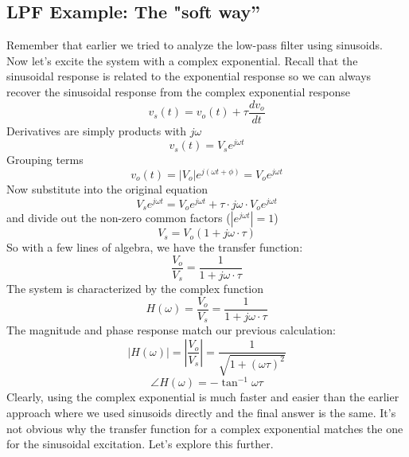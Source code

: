 \subsection{LPF Example:  The "soft way''}
Remember that earlier we tried to analyze the low-pass filter using sinusoids.  Now let's excite the system with a complex exponential.  Recall that the sinusoidal response is related to the exponential response so we can always recover the sinusoidal response from the complex exponential response
    \begin{equation}
        v_s(t) = v_o(t) + \tau \frac{dv_o}{dt}
    \end{equation}
Derivatives are simply products with $j\omega$
    \begin{equation}
        v_s(t) = V_s e^{j\omega t}
    \end{equation}
Grouping terms
    \begin{equation}
        v_o(t) = |V_o| e^{j (\omega t + \phi)} = V_o e^{j\omega t}
    \end{equation}
Now substitute into the original equation
    \begin{equation}
        V_s e^{j \omega t} = V_o e^{j \omega t}  + \tau \cdot j\omega \cdot V_o e^{j \omega t}
    \end{equation}
and divide out the non-zero common factors ($|e^{j\omega t} | = 1$)
    \begin{equation}
        V_s = V_o ( 1 + j \omega \cdot \tau)
    \end{equation}
So with a few lines of algebra, we have the transfer function:
    \begin{equation}
        \frac{V_o}{V_s} = \frac{1}{1 + j\omega \cdot \tau}
    \end{equation}
The system is characterized by the complex function
    \begin{equation}
        H(\omega) = \frac{V_o}{V_s} = \frac{1}{1 + j\omega \cdot \tau}
    \end{equation}
The magnitude and phase response match our previous calculation:
    \begin{equation}
        | H(\omega) | = \left|\frac{V_o}{V_s}\right| = \frac{1}{\sqrt{1 + (\omega \tau)^2}}
    \end{equation}
    \begin{equation}
        \angle H(\omega) = - \tan^{-1} \omega \tau
    \end{equation}
Clearly, using the complex exponential is much faster and easier than the earlier approach where we used sinusoids directly and the final answer is the same.  It's not obvious why the transfer function for a complex exponential matches the one for the sinusoidal excitation.  Let's explore this further.
